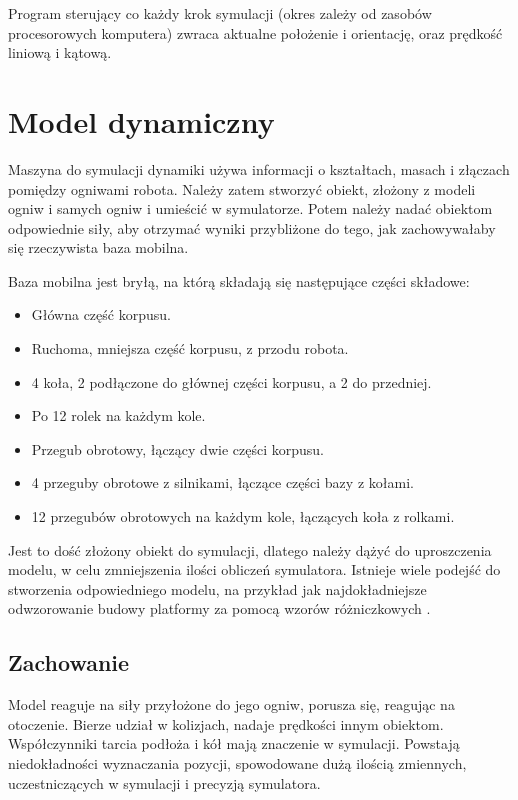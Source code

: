 		Program sterujący co każdy krok symulacji (okres zależy od zasobów procesorowych komputera) zwraca aktualne położenie i orientację, oraz prędkość liniową i kątową. 

\section{Model dynamiczny}
	\label{sec:omnivelma}
	Maszyna do symulacji dynamiki używa informacji o kształtach, masach i złączach pomiędzy ogniwami robota.
	Należy zatem stworzyć obiekt, złożony z modeli ogniw i samych ogniw i umieścić w symulatorze.
	Potem należy nadać obiektom odpowiednie siły, aby otrzymać wyniki przybliżone do tego, jak zachowywałaby się rzeczywista baza mobilna.

	Baza mobilna jest bryłą, na którą składają się następujące części składowe:
	\begin{itemize}
	\item Główna część korpusu.
	\item Ruchoma, mniejsza część korpusu, z przodu robota.
	\item 4 koła, 2 podłączone do głównej części korpusu, a 2 do przedniej.
	\item Po 12 rolek na każdym kole.
	\item Przegub obrotowy, łączący dwie części korpusu.
	\item 4 przeguby obrotowe z silnikami, łączące części bazy z kołami.
	\item 12 przegubów obrotowych na każdym kole, łączących koła z rolkami.
	\end{itemize}

	Jest to dość złożony obiekt do symulacji, dlatego należy dążyć do uproszczenia modelu, w celu zmniejszenia ilości obliczeń symulatora.
	Istnieje wiele podejść do stworzenia odpowiedniego modelu, na przykład jak najdokładniejsze odwzorowanie budowy platformy 
	za pomocą wzorów różniczkowych \cite{braking} \cite{modelling_ways}.
	
	\subsection{Zachowanie}
		Model reaguje na siły przyłożone do jego ogniw, porusza się, reagując na otoczenie.
		Bierze udział w kolizjach, nadaje prędkości innym obiektom.
		Współczynniki tarcia podłoża i kół mają znaczenie w symulacji.
		Powstają niedokładności wyznaczania pozycji, spowodowane dużą ilością zmiennych, uczestniczących w symulacji i precyzją symulatora.
	
